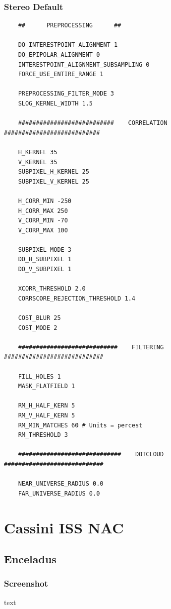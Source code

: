 \subsubsection*{Stereo Default}

\begin{verbatim}
    ##      PREPROCESSING      ##

    DO_INTERESTPOINT_ALIGNMENT 1
    DO_EPIPOLAR_ALIGNMENT 0
    INTERESTPOINT_ALIGNMENT_SUBSAMPLING 0
    FORCE_USE_ENTIRE_RANGE 1

    PREPROCESSING_FILTER_MODE 3
    SLOG_KERNEL_WIDTH 1.5

    ###########################    CORRELATION    ###########################

    H_KERNEL 35
    V_KERNEL 35
    SUBPIXEL_H_KERNEL 25
    SUBPIXEL_V_KERNEL 25

    H_CORR_MIN -250
    H_CORR_MAX 250
    V_CORR_MIN -70
    V_CORR_MAX 100

    SUBPIXEL_MODE 3
    DO_H_SUBPIXEL 1
    DO_V_SUBPIXEL 1

    XCORR_THRESHOLD 2.0
    CORRSCORE_REJECTION_THRESHOLD 1.4

    COST_BLUR 25
    COST_MODE 2

    ############################    FILTERING    ############################

    FILL_HOLES 1
    MASK_FLATFIELD 1

    RM_H_HALF_KERN 5
    RM_V_HALF_KERN 5
    RM_MIN_MATCHES 60 # Units = percest
    RM_THRESHOLD 3

    #############################    DOTCLOUD    ############################

    NEAR_UNIVERSE_RADIUS 0.0
    FAR_UNIVERSE_RADIUS 0.0
\end{verbatim}

\section{Cassini ISS NAC}

\subsection{Enceladus}

\subsubsection*{Screenshot}

text


